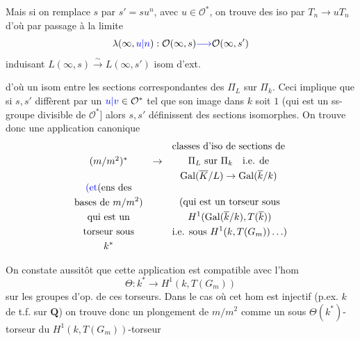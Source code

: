 Mais si on remplace $s$ par $s'=su^n$, avec $u\in\mathcal{O}^*$, on trouve des iso
par $T_n\to uT_n$
d'où par passage à la limite
\[
\lambda(\infty,\textcolor{blue}{u|n}):\mathcal{O}(\infty,s)\textcolor{blue}{\longrightarrow}\mathcal{O}(\infty,s')
\]
induisant $L(\infty,s)\xrightarrow{\sim}L(\infty,s')$ isom d'ext. 



d'où un isom entre les sections correspondantes des $\Pi_{L}$ sur $\Pi_k$.
Ceci implique que si $s,s'$ diffèrent par un $\textcolor{blue}{u|v}\in\mathcal{O}^*$ tel que son image dans $k$ soit $1$   (qui est un ss-groupe divisible de $\mathcal{O}^*$] alors $s,s'$ définissent des sections isomorphes.
On trouve donc une application canonique
\[
\begin{array}{ccl}
(m/m^2)^* & \to &
\begin{gathered}
\text{classes d'iso de sections de}\\
\Pi_L\text{ sur }\Pi_k\quad\text{i.e. de}\\
\operatorname{Gal}(\overline{K}/L)\to\operatorname{Gal}(\overline{k}/k)
\end{gathered}
\\[1ex]
\begin{gathered}
\deleted{\unsure{\text{(et}}}\text{(ens des}\\
\text{bases de }m/m^2\text{)}\\
\text{qui est un}\\
\text{torseur sous}\\ k^*
\end{gathered}
&&
\begin{gathered}
\text{(qui est un torseur sous}\\
H^1(\operatorname{Gal}(\overline{k}/k),T(\overline{k}))\\
\text{i.e. sous }H^1(k,T(G_m))\ldots)
\end{gathered}
\end{array}
\]

On constate aussitôt que cette application est compatible avec l'hom
\[
\Theta:k^*\to H^1(k,T(G_m))
\]
sur les groupes d'op. de ces torseurs.
Dans le cas où cet hom est injectif (p.ex. $k$  de t.f. sur $\mathbf{Q}$) on trouve donc un plongement de $m/m^2$ comme un sous $\Theta(k^*)$-torseur du $H^1(k,T(G_m))$-torseur

